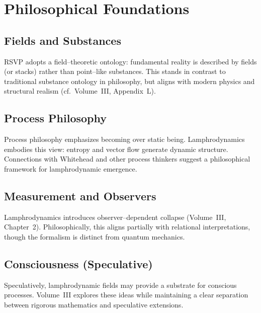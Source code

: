 
\chapter{Philosophical Foundations}
\label{chap:philosophy}

\section{Fields and Substances}

RSVP adopts a field--theoretic ontology: fundamental reality is described
by fields (or stacks) rather than point--like substances. This stands in
contrast to traditional substance ontology in philosophy, but aligns with
modern physics and structural realism (cf.~Volume~III, Appendix~L).

\section{Process Philosophy}

Process philosophy emphasizes becoming over static being. Lamphrodynamics
embodies this view: entropy and vector flow generate dynamic structure.
Connections with Whitehead and other process thinkers suggest a
philosophical framework for lamphrodynamic emergence.

\section{Measurement and Observers}

Lamphrodynamics introduces observer--dependent collapse (Volume~III,
Chapter~2). Philosophically, this aligns partially with relational
interpretations, though the formalism is distinct from quantum mechanics.

\section{Consciousness (Speculative)}

Speculatively, lamphrodynamic fields may provide a substrate for
conscious processes. Volume~III explores these ideas while maintaining a
clear separation between rigorous mathematics and speculative extensions.


\newpage
